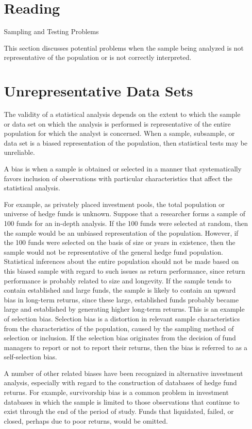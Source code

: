 \documentclass[11pt]{article}
\begin{document}
\section*{Reading}
Sampling and Testing Problems

This section discusses potential problems when the sample being analyzed is not representative of the population or is not correctly interpreted.

\section*{Unrepresentative Data Sets}
The validity of a statistical analysis depends on the extent to which the sample or data set on which the analysis is performed is representative of the entire population for which the analyst is concerned. When a sample, subsample, or data set is a biased representation of the population, then statistical tests may be unreliable.

A bias is when a sample is obtained or selected in a manner that systematically favors inclusion of observations with particular characteristics that affect the statistical analysis.

For example, as privately placed investment pools, the total population or universe of hedge funds is unknown. Suppose that a researcher forms a sample of 100 funds for an in-depth analysis. If the 100 funds were selected at random, then the sample would be an unbiased representation of the population. However, if the 100 funds were selected on the basis of size or years in existence, then the sample would not be representative of the general hedge fund population. Statistical inferences about the entire population should not be made based on this biased sample with regard to such issues as return performance, since return performance is probably related to size and longevity. If the sample tends to contain established and large funds, the sample is likely to contain an upward bias in long-term returns, since these large, established funds probably became large and established by generating higher long-term returns. This is an example of selection bias. Selection bias is a distortion in relevant sample characteristics from the characteristics of the population, caused by the sampling method of selection or inclusion. If the selection bias originates from the decision of fund managers to report or not to report their returns, then the bias is referred to as a self-selection bias.

A number of other related biases have been recognized in alternative investment analysis, especially with regard to the construction of databases of hedge fund returns. For example, survivorship bias is a common problem in investment databases in which the sample is limited to those observations that continue to exist through the end of the period of study. Funds that liquidated, failed, or closed, perhaps due to poor returns, would be omitted.
\end{document}

